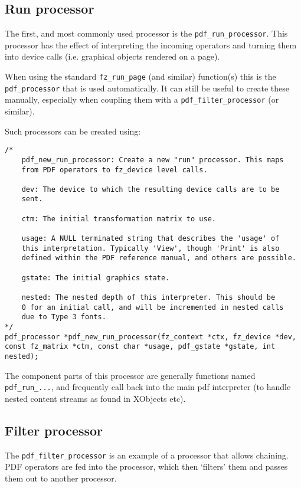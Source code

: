 \documentclass[oneside]{book}
\begin{document}
\subsection{Run processor}

The first, and most commonly used processor is the \texttt{pdf\_run\_processor}. This processor has the effect of interpreting the incoming operators and turning them into device calls (i.e. graphical objects rendered on a page).

When using the standard \texttt{fz\_run\_page} (and similar) function(s) this is the \texttt{pdf\_processor} that is used automatically. It can still be useful to create these manually, especially when coupling them with a \texttt{pdf\_filter\_processor}
(or similar).

Such processors can be created using:

\begin{lstlisting}
/*
	pdf_new_run_processor: Create a new "run" processor. This maps
	from PDF operators to fz_device level calls.

	dev: The device to which the resulting device calls are to be
	sent.

	ctm: The initial transformation matrix to use.

	usage: A NULL terminated string that describes the 'usage' of
	this interpretation. Typically 'View', though 'Print' is also
	defined within the PDF reference manual, and others are possible.

	gstate: The initial graphics state.

	nested: The nested depth of this interpreter. This should be
	0 for an initial call, and will be incremented in nested calls
	due to Type 3 fonts.
*/
pdf_processor *pdf_new_run_processor(fz_context *ctx, fz_device *dev, const fz_matrix *ctm, const char *usage, pdf_gstate *gstate, int nested);
\end{lstlisting}

The component parts of this processor are generally functions named \texttt{pdf\_run\_...}, and frequently call back into the main pdf interpreter (to handle nested content streams as found in XObjects etc).

\subsection{Filter processor}

The \texttt{pdf\_filter\_processor} is an example of a processor that allows chaining. PDF operators are fed into the processor, which then `filters' them and passes them out to another processor.
\end{document}
